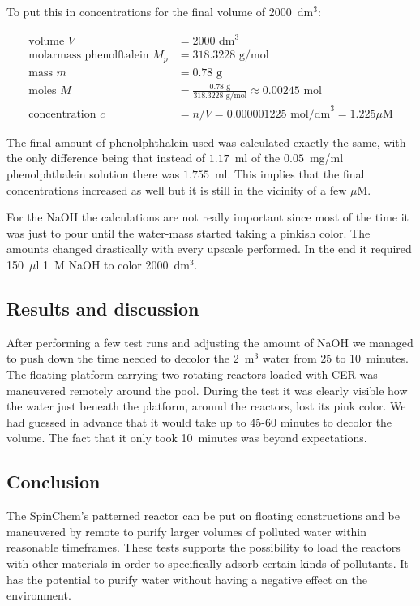 To put this in concentrations for the final volume of 2000~dm$^3$:

\begin{align}
    \text{volume } V &= 2000 \text{ dm}^3 \\
    \text{molarmass phenolftalein } M_p &= 318.3228 \text{ g/mol} \\
    \text{mass } m &= 0.78 \text{ g} \\
    \text{moles } M &= \frac{0.78 \text{ g}}{318.3228 \text{ g/mol}} \approx 0.00245 \text{ mol} \\
    \text{concentration } c &= n/V = 0.000001225 \text{ mol/dm}^3 = 1.225 \mu\text{M}
\end{align}

The final amount of phenolphthalein used was calculated exactly the same, with the only difference being that instead of $1.17$~ml of the $0.05$~mg/ml phenolphthalein solution there was $1.755$~ml.
This implies that the final concentrations increased as well but it is still in the vicinity of a few $\mu$M.

For the NaOH the calculations are not really important since most of the time it was just to pour until the water-mass started taking a pinkish color.
The amounts changed drastically with every upscale performed. In the end it required 150~$\mu$l 1~M NaOH to color 2000~dm$^3$.

\subsection{Results and discussion}
After performing a few test runs and adjusting the amount of NaOH we managed to push down the time needed to decolor the 2~m$^3$ water from 25 to 10~minutes.
The floating platform carrying two rotating reactors loaded with CER was maneuvered remotely around the pool. During the test it was clearly visible how the water just beneath the platform, around the reactors, lost its pink color.
We had guessed in advance that it would take up to 45-60 minutes to decolor the volume. The fact that it only took 10~minutes was beyond expectations.

\subsection{Conclusion}
The SpinChem\textsuperscript{\textregistered}'s patterned reactor can be put on floating constructions and be maneuvered by remote to purify larger volumes of polluted water within reasonable timeframes.
These tests supports the possibility to load the reactors with other materials in order to specifically adsorb certain kinds of pollutants. It has the potential to purify water without having a negative effect on the environment.
